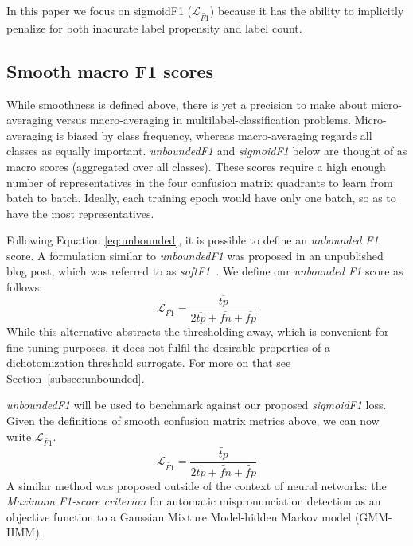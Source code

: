 In this paper we focus on sigmoidF1 ($\mathcal{L}_{\widetilde{\mathit{F1}}}$) because it has the ability to implicitly penalize for both inacurate label propensity and label count.


\subsection{Smooth macro F1 scores}
\label{sec:orgc5d29d7}

While smoothness is defined above, there is yet a precision to make about micro-averaging versus macro-averaging in multilabel-classification problems. Micro-averaging is biased by class frequency, whereas macro-averaging regards all classes as equally important. \emph{unboundedF1} and \emph{sigmoidF1} below are thought of as macro scores (aggregated over all classes). These scores require a high enough number of representatives in the four confusion matrix quadrants to learn from batch to batch. Ideally, each training epoch would have only one batch, so as to have the most representatives.

Following Equation \ref{eq:unbounded}, it is possible to define an \emph{unbounded F1} score. A formulation similar to \emph{unboundedF1} was proposed in an unpublished blog post, which was referred to as \emph{softF1}~\cite{softF1}. We define our \emph{unbounded F1} score as follows:
%
\begin{equation}
\mathcal{L}_{\overline{\mathit{F1}}}= \frac{\overline{tp}}{2 \overline{tp}+ \overline{fn}+ \overline{fp}}
\end{equation}
%
While this alternative abstracts the thresholding away, which is convenient for fine-tuning purposes, it does not fulfil the desirable properties of a dichotomization threshold surrogate. For more on that see Section~\ref{subsec:unbounded}.

\emph{unboundedF1} will be used to benchmark against our proposed \emph{sigmoidF1} loss. Given the definitions of smooth confusion matrix metrics above, we can now write $\mathcal{L}_{\widetilde{\mathit{F1}}}$.
%
\begin{equation}\label{eq:sigmoidF1}
\mathcal{L}_{\widetilde{\mathit{F1}}}= \frac{\widetilde{\mathit{tp}}}{2 \widetilde{\mathit{tp}}+ \widetilde{\mathit{fn}}+ \widetilde{\mathit{fp}}}
\end{equation}
%
A similar method was proposed outside of the context of neural networks: the \emph{Maximum F1-score criterion} for automatic mispronunciation detection as an objective function to a Gaussian Mixture Model-hidden Markov model (GMM-HMM)\cite{sigmoid}.

